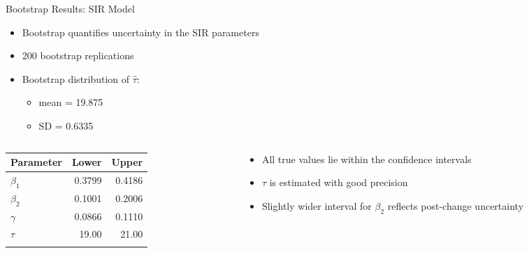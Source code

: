 \documentclass[
  ignorenonframetext,
  aspectratio=169,
]{beamer}
\providecommand{\tightlist}{%
  \setlength{\itemsep}{0pt}\setlength{\parskip}{0pt}}\usepackage{longtable,booktabs,array}
\begin{document}
\begin{frame}{Bootstrap Results: SIR Model}
\label{bootstrap-results-sir-model}
\begin{itemize}
\item
  Bootstrap quantifies uncertainty in the SIR parameters
\item
  200 bootstrap replications
\item
  Bootstrap distribution of \(\hat\tau\):

  \begin{itemize}
  \tightlist
  \item
    mean = 19.875
  \item
    SD = 0.6335
  \end{itemize}
\end{itemize}

\begin{columns}[T]
\begin{column}{0.5\textwidth}
\vspace{-10pt}

\begin{longtable}[]{@{}lrr@{}}
\toprule\noalign{}
Parameter & Lower & Upper \\
\midrule\noalign{}
\endhead
\(\beta_1\) & 0.3799 & 0.4186 \\
\(\beta_2\) & 0.1001 & 0.2006 \\
\(\gamma\) & 0.0866 & 0.1110 \\
\(\tau\) & 19.00 & 21.00 \\
\bottomrule\noalign{}
\end{longtable}
\end{column}

\begin{column}{0.5\textwidth}
\begin{itemize}
\tightlist
\item
  All true values lie within the confidence intervals
\item
  \(\tau\) is estimated with good precision
\item
  Slightly wider interval for \(\beta_2\) reflects post-change
  uncertainty
\end{itemize}
\end{column}
\end{columns}
\end{frame}
\end{document}
